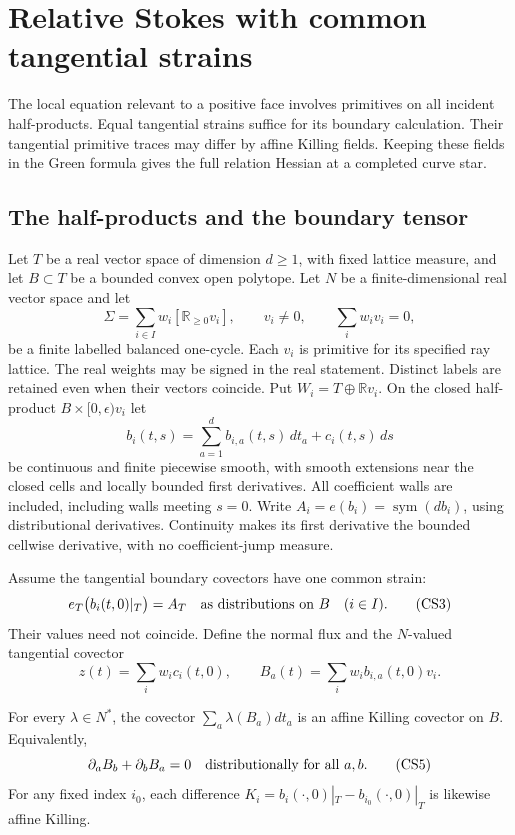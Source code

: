 \section{Relative Stokes with common tangential strains}
\label{sec:r13-common-strain-stokes}

The local equation relevant to a positive face involves primitives on
all incident half-products.  Equal tangential strains suffice for its
boundary calculation.  Their tangential primitive traces may differ
by affine Killing fields.  Keeping these fields in the Green formula
gives the full relation Hessian at a completed curve star.

\subsection{The half-products and the boundary tensor}

Let $T$ be a real vector space of dimension $d\geq1$, with fixed
lattice measure, and let $B\subset T$ be a bounded convex open
polytope.  Let $N$ be a finite-dimensional real vector space and
let
\[
 \Sigma=\sum_{i\in I}w_i[\mathbb R_{\geq0}v_i],\qquad
 v_i\ne0,\qquad \sum_iw_iv_i=0,
 \tag{CS1}
\]
be a finite labelled balanced one-cycle.  Each $v_i$ is primitive
for its specified ray lattice.  The real weights may be signed in
the real statement.  Distinct labels are retained even when their
vectors coincide.  Put $W_i=T\oplus\mathbb Rv_i$.  On the closed
half-product $B\times[0,\epsilon)v_i$ let
\[
 b_i(t,s)=\sum_{a=1}^d b_{i,a}(t,s)\,dt_a+c_i(t,s)\,ds
 \tag{CS2}
\]
be continuous and finite piecewise smooth, with smooth extensions
near the closed cells and locally bounded first derivatives.  All
coefficient walls are included, including walls meeting $s=0$.
Write $A_i=e(b_i)=\operatorname{sym}(db_i)$, using distributional
derivatives.  Continuity makes its first derivative the bounded
cellwise derivative, with no coefficient-jump measure.

Assume the tangential boundary covectors have one common strain:
\[
       e_T\bigl(b_i(t,0)|_T\bigr)=A_T
       \quad\hbox{as distributions on }B\quad(i\in I).
 \tag{CS3}
\]
Their values need not coincide.  Define the normal flux and the
$N$-valued tangential covector
\[
 z(t)=\sum_iw_ic_i(t,0),\qquad
 B_a(t)=\sum_iw_ib_{i,a}(t,0)v_i.
 \tag{CS4}
\]

\begin{lemma}
\label{lem:r13-weighted-killing-trace}
For every $\lambda\in N^*$, the covector
$\sum_a\lambda(B_a)dt_a$ is an affine Killing covector on $B$.
Equivalently,
\[
 \partial_aB_b+\partial_bB_a=0
       \quad\hbox{distributionally for all }a,b.
 \tag{CS5}
\]
For any fixed index $i_0$, each difference
$K_i=b_i(\cdot,0)|_T-b_{i_0}(\cdot,0)|_T$ is likewise affine
Killing.
\end{lemma}

